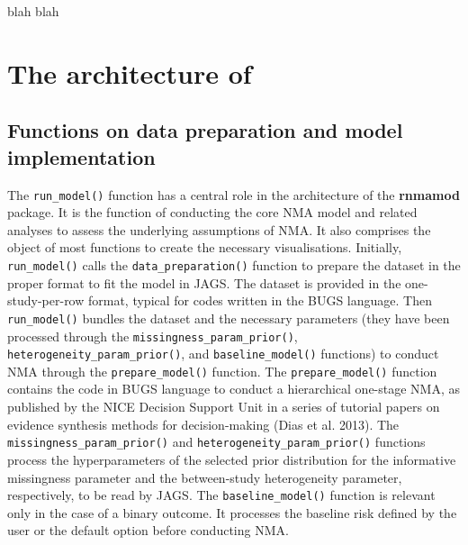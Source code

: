 blah blah

\hypertarget{the-architecture-of}{%
\section{\texorpdfstring{The architecture of }{The architecture of }}\label{the-architecture-of}}

\hypertarget{functions-on-data-preparation-and-model-implementation}{%
\subsection{Functions on data preparation and model implementation}\label{functions-on-data-preparation-and-model-implementation}}

The \texttt{run\_model()} function has a central role in the architecture of the \textbf{rnmamod}
package. It is the function of conducting the core NMA model and related analyses
to assess the underlying assumptions of NMA. It also comprises the object of most
functions to create the necessary visualisations. Initially, \texttt{run\_model()} calls
the \texttt{data\_preparation()} function to prepare the dataset in the proper format to
fit the model in JAGS. The dataset is provided in the one-study-per-row format,
typical for codes written in the BUGS language. Then \texttt{run\_model()} bundles the
dataset and the necessary parameters (they have been processed through the
\texttt{missingness\_param\_prior()}, \texttt{heterogeneity\_param\_prior()}, and \texttt{baseline\_model()}
functions) to conduct NMA through the \texttt{prepare\_model()} function. The \texttt{prepare\_model()}
function contains the code in BUGS language to conduct a hierarchical one-stage
NMA, as published by the NICE Decision Support Unit in a series of tutorial papers
on evidence synthesis methods for decision-making (Dias et al. 2013). The \texttt{missingness\_param\_prior()}
and \texttt{heterogeneity\_param\_prior()} functions process the hyperparameters of the
selected prior distribution for the informative missingness parameter and the
between-study heterogeneity parameter, respectively, to be read by JAGS.
The \texttt{baseline\_model()} function is relevant only in the case of a binary outcome.
It processes the baseline risk defined by the user or the default option before
conducting NMA.

